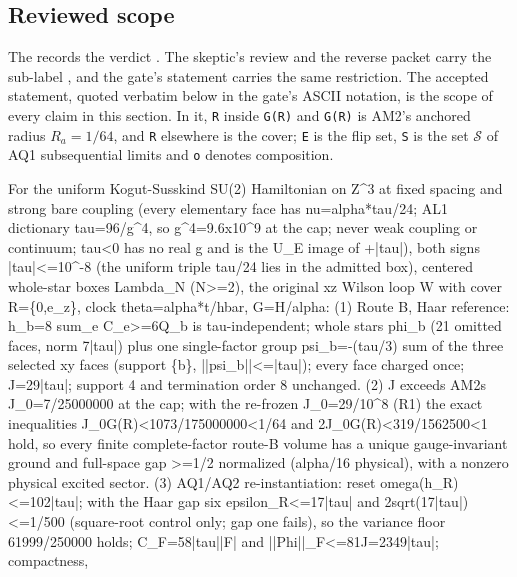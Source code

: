 \subsection{Reviewed scope}
The  records the
verdict . The skeptic's review and the reverse
packet carry the sub-label , and
the gate's statement carries the same restriction. The accepted statement,
quoted verbatim below in the gate's ASCII notation, is the scope of every claim
in this section. In it, \texttt{R} inside \texttt{G(R)} and
\texttt{G\textquotesingle{}(R)} is AM2's anchored radius $R_a=1/64$, and
\texttt{R} elsewhere is the cover; \texttt{E} is the flip set, \texttt{S} is
the set $\mathcal S$ of AQ1 subsequential limits and \texttt{o} denotes
composition.
\begin{gatequote}
For the uniform Kogut-Susskind SU(2) Hamiltonian on Z\textasciicircum{}3 at
fixed spacing and strong bare coupling (every elementary face has
nu=alpha*tau/24; AL1 dictionary tau=96/g\textasciicircum{}4, so
g\textasciicircum{}4=9.6x10\textasciicircum{}9 at the cap; never weak coupling
or continuum; tau<0 has no real g and is the U\_E image of +|tau|), both signs
|tau|<=10\textasciicircum{}-8 (the uniform triple tau/24 lies in the admitted
box), centered whole-star boxes Lambda\_N (N>=2), the original xz Wilson loop
W with cover R=\{0,e\_z\}, clock theta=alpha*t/hbar, G=H/alpha: (1) Route B,
Haar reference: h\_b=8 sum\_e C\_e>=6Q\_b is tau-independent; whole stars
phi\_b (21 omitted faces, norm 7|tau|) plus one single-factor group
psi\_b=-(tau/3) sum of the three selected xy faces (support \{b\},
||psi\_b||<=|tau|); every face charged once; J\textquotesingle{}=29|tau|;
support 4 and termination order 8 unchanged. (2) J\textquotesingle{} exceeds
AM2\textquotesingle{}s J\_0=7/25000000 at the cap; with the re-frozen
J\_0\textquotesingle{}=29/10\textasciicircum{}8 (R1) the exact inequalities
J\_0\textquotesingle{}G(R)<1073/175000000<1/64 and
2J\_0\textquotesingle{}G\textquotesingle{}(R)<319/1562500<1 hold, so every
finite complete-factor route-B volume has a unique gauge-invariant ground and
full-space gap >=1/2 normalized (alpha/16 physical), with a nonzero physical
excited sector. (3) AQ1/AQ2 re-instantiation: reset omega(h\_R)<=102|tau|;
with the Haar gap six epsilon\_R<=17|tau| and 2sqrt(17|tau|)<=1/500
(square-root control only; gap one fails), so the variance floor 61999/250000
holds; C\_F=58|tau||F| and
||Phi\textquotesingle{}||\_F<=81J\textquotesingle{}=2349|tau|; compactness,

\end{gatequote}

